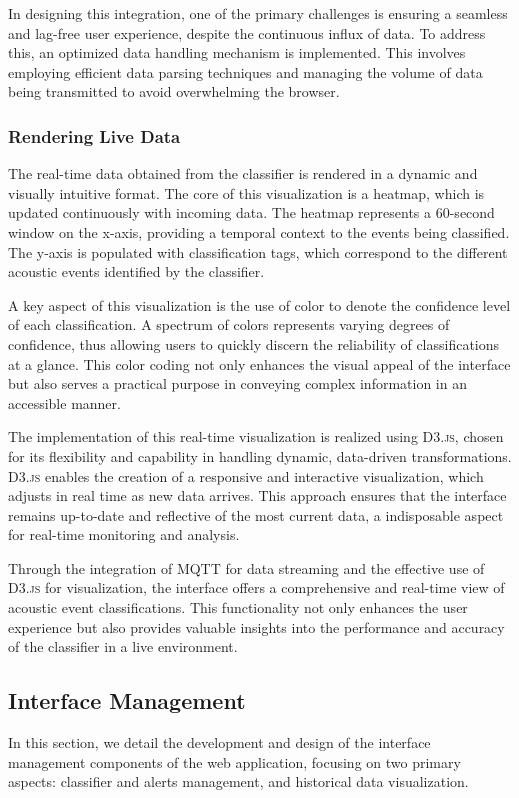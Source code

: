 In designing this integration, one of the primary challenges is ensuring a seamless and lag-free user experience, despite the continuous influx of data. To address this, an optimized data handling mechanism is implemented. This involves employing efficient data parsing techniques and managing the volume of data being transmitted to avoid overwhelming the browser.

\subsubsection{Rendering Live Data}
The real-time data obtained from the classifier is rendered in a dynamic and visually intuitive format. The core of this visualization is a heatmap, which is updated continuously with incoming data. The heatmap represents a 60-second window on the x-axis, providing a temporal context to the events being classified. The y-axis is populated with classification tags, which correspond to the different acoustic events identified by the classifier.

A key aspect of this visualization is the use of color to denote the confidence level of each classification. A spectrum of colors represents varying degrees of confidence, thus allowing users to quickly discern the reliability of classifications at a glance. This color coding not only enhances the visual appeal of the interface but also serves a practical purpose in conveying complex information in an accessible manner.

The implementation of this real-time visualization is realized using \textsc{D3.js}, chosen for its flexibility and capability in handling dynamic, data-driven transformations. \textsc{D3.js} enables the creation of a responsive and interactive visualization, which adjusts in real time as new data arrives. This approach ensures that the interface remains up-to-date and reflective of the most current data, a indisposable aspect for real-time monitoring and analysis.

Through the integration of MQTT for data streaming and the effective use of \textsc{D3.js} for visualization, the interface offers a comprehensive and real-time view of acoustic event classifications. This functionality not only enhances the user experience but also provides valuable insights into the performance and accuracy of the classifier in a live environment.

\subsection{Interface Management}
In this section, we detail the development and design of the interface management components of the web application, focusing on two primary aspects: classifier and alerts management, and historical data visualization.

